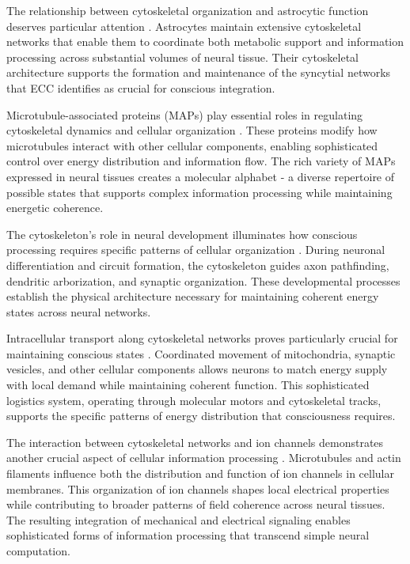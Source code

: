 \begin{refsection}
The relationship between cytoskeletal organization and astrocytic function deserves particular attention \cite{Sanchez-Huertas2016}. Astrocytes maintain extensive cytoskeletal networks that enable them to coordinate both metabolic support and information processing across substantial volumes of neural tissue. Their cytoskeletal architecture supports the formation and maintenance of the syncytial networks that ECC identifies as crucial for conscious integration.

Microtubule-associated proteins (MAPs) play essential roles in regulating cytoskeletal dynamics and cellular organization \cite{Roll-Mecak2020}. These proteins modify how microtubules interact with other cellular components, enabling sophisticated control over energy distribution and information flow. The rich variety of MAPs expressed in neural tissues creates a molecular alphabet - a diverse repertoire of possible states that supports complex information processing while maintaining energetic coherence.

The cytoskeleton's role in neural development illuminates how conscious processing requires specific patterns of cellular organization \cite{Stiess2011}. During neuronal differentiation and circuit formation, the cytoskeleton guides axon pathfinding, dendritic arborization, and synaptic organization. These developmental processes establish the physical architecture necessary for maintaining coherent energy states across neural networks.

Intracellular transport along cytoskeletal networks proves particularly crucial for maintaining conscious states \cite{Vallee2006}. Coordinated movement of mitochondria, synaptic vesicles, and other cellular components allows neurons to match energy supply with local demand while maintaining coherent function. This sophisticated logistics system, operating through molecular motors and cytoskeletal tracks, supports the specific patterns of energy distribution that consciousness requires.

The interaction between cytoskeletal networks and ion channels demonstrates another crucial aspect of cellular information processing \cite{Conde2009}. Microtubules and actin filaments influence both the distribution and function of ion channels in cellular membranes. This organization of ion channels shapes local electrical properties while contributing to broader patterns of field coherence across neural tissues. The resulting integration of mechanical and electrical signaling enables sophisticated forms of information processing that transcend simple neural computation.


\end{refsection}
